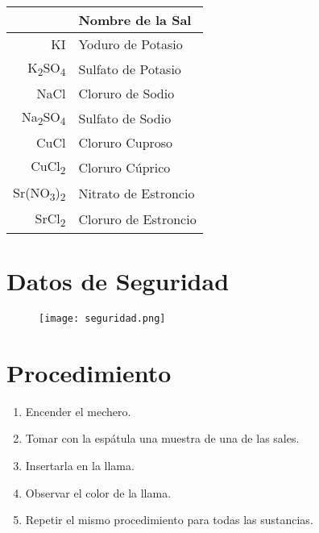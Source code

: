 \documentclass{article}
\begin{document}
\begin{table}[H]
\begin{tabular}{|r|l|}
\hline
\rowcolor[HTML]{C0C0C0} 
\multicolumn{1}{|l|}{\cellcolor[HTML]{C0C0C0}Fórmula} & Nombre de la Sal \\ \hline
\rowcolor[HTML]{FFFFFF} 
KI & \cellcolor[HTML]{FFFFFF}Yoduro de Potasio \\ \hline
\cellcolor[HTML]{FFFFFF}K\textsubscript{2}SO\textsubscript{4} & Sulfato de Potasio \\ \hline
\cellcolor[HTML]{FFFFFF}NaCl & Cloruro de Sodio \\ \hline
\cellcolor[HTML]{FFFFFF}Na\textsubscript{2}SO\textsubscript{4} & Sulfato de Sodio \\ \hline
\cellcolor[HTML]{FFFFFF}CuCl & Cloruro Cuproso \\ \hline
\cellcolor[HTML]{FFFFFF}CuCl\textsubscript{2} & Cloruro Cúprico \\ \hline
Sr(NO\textsubscript{3})\textsubscript{2} & Nitrato de Estroncio \\ \hline
\cellcolor[HTML]{FFFFFF}SrCl\textsubscript{2} & Cloruro de Estroncio \\ \hline
\end{tabular}
\end{table}

\section{Datos de Seguridad}

\begin{figure}[H]
    \texttt{[image: seguridad.png]}
    \label{fig:hazard}
\end{figure}

\section{Procedimiento}

\begin{enumerate}
  \item Encender el mechero.
  \item Tomar con la espátula una muestra de una de las sales.
  \item Insertarla en la llama.
  \item Observar el color de la llama.
  \item Repetir el mismo procedimiento para todas las sustancias.

\end{enumerate}
\end{document}

